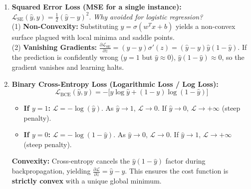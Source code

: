 \documentclass[10pt,a4paper]{article}
\begin{document}
\begin{enumerate}[leftmargin=14pt, itemsep=1.5pt, topsep=1pt]
    \item \textbf{Squared Error Loss (MSE for a single instance):}
    $\mathcal{L}_{\text{SE}}(\hat{y}, y) = \frac{1}{2}(\hat{y} - y)^2$.
    \textit{Why avoided for logistic regression?}\\
    (1) \textbf{Non-Convexity:} Substituting $\hat{y} = \sigma(w^T x + b)$ yields a non-convex surface plagued with local minima and saddle points.\\
    (2) \textbf{Vanishing Gradients:} $\frac{\partial \mathcal{L}_{\text{SE}}}{\partial z} = (\hat{y} - y)\sigma'(z) = (\hat{y} - y)\hat{y}(1 - \hat{y})$. If the prediction is confidently wrong ($y = 1$ but $\hat{y} \approx 0$), $\hat{y}(1 - \hat{y}) \approx 0$, so the gradient vanishes and learning halts.

    \item \textbf{Binary Cross-Entropy Loss (Logarithmic Loss / Log Loss):}
    \[
    \mathcal{L}_{\text{BCE}}(\hat{y}, y) = -\big[ y \log \hat{y} + (1 - y) \log(1 - \hat{y}) \big]
    \]
    \begin{itemize}[leftmargin=10pt, itemsep=0.5pt]
        \item \textbf{If $y = 1$:} $\mathcal{L} = -\log(\hat{y})$. As $\hat{y} \to 1$, $\mathcal{L} \to 0$. If $\hat{y} \to 0$, $\mathcal{L} \to +\infty$ (steep penalty).
        \item \textbf{If $y = 0$:} $\mathcal{L} = -\log(1 - \hat{y})$. As $\hat{y} \to 0$, $\mathcal{L} \to 0$. If $\hat{y} \to 1$, $\mathcal{L} \to +\infty$ (steep penalty).
    \end{itemize}
    \textbf{Convexity:} Cross-entropy cancels the $\hat{y}(1 - \hat{y})$ factor during backpropagation, yielding $\frac{\partial \mathcal{L}}{\partial z} = \hat{y} - y$. This ensures the cost function is \textbf{strictly convex} with a unique global minimum.
\end{enumerate}

\vspace{1pt}
\end{document}
